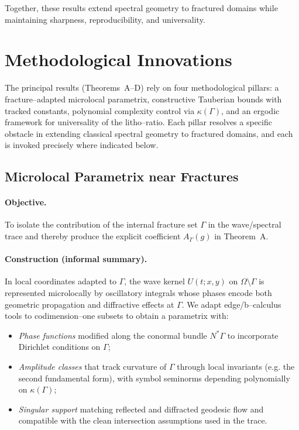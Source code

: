 Together, these results extend spectral geometry to fractured domains while
maintaining sharpness, reproducibility, and universality.


\section{Methodological Innovations}

The principal results (Theorems~A–D) rely on four methodological pillars:
a fracture–adapted microlocal parametrix, constructive Tauberian bounds with
tracked constants, polynomial complexity control via \(\kappa(\Gamma)\), and
an ergodic framework for universality of the litho–ratio. Each pillar resolves
a specific obstacle in extending classical spectral geometry to fractured
domains, and each is invoked precisely where indicated below.

\subsection{Microlocal Parametrix near Fractures}

\paragraph{Objective.}
To isolate the contribution of the internal fracture set \(\Gamma\) in the
wave/spectral trace and thereby produce the explicit coefficient
\(A_\Gamma(g)\) in Theorem~A.

\paragraph{Construction (informal summary).}
In local coordinates adapted to \(\Gamma\), the wave kernel \(U(t;x,y)\) on
\(\Omega\setminus\Gamma\) is represented microlocally by oscillatory integrals
whose phases encode both geometric propagation and diffractive effects at
\(\Gamma\). We adapt edge/b–calculus tools to codimension–one subsets to obtain
a parametrix with:
\begin{itemize}
  \item \emph{Phase functions} modified along the conormal bundle \(N^\ast\Gamma\)
  to incorporate Dirichlet conditions on \(\Gamma\);
  \item \emph{Amplitude classes} that track curvature of \(\Gamma\) through local
  invariants (e.g. the second fundamental form), with symbol seminorms depending
  polynomially on \(\kappa(\Gamma)\);
  \item \emph{Singular support} matching reflected and diffracted geodesic flow
  and compatible with the clean intersection assumptions used in the trace.
\end{itemize}

